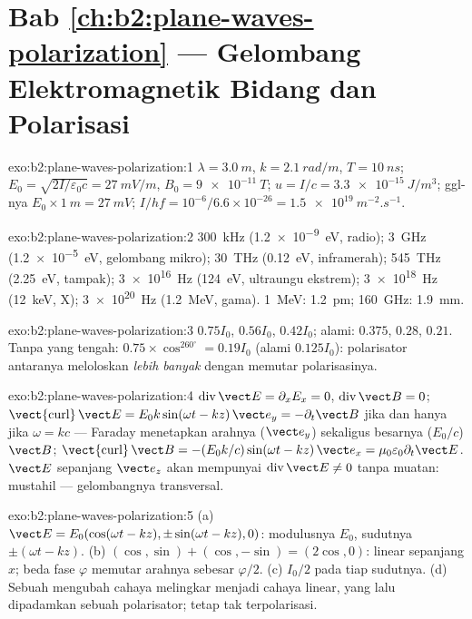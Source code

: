 \section*{Bab \ref{ch:b2:plane-waves-polarization} --- Gelombang Elektromagnetik Bidang dan Polarisasi}

\begin{solution}{exo:b2:plane-waves-polarization:1}
$\lambda = \qty{3.0}{m}$, $k = \qty{2.1}{rad/m}$, $T = \qty{10}{ns}$; $E_0 = \sqrt{2I/\varepsilon_0c}
= \qty{27}{mV/m}$, $B_0 = \qty{9e-11}{T}$; $u = I/c = \qty{3.3e-15}{J/m^3}$; ggl-nya
$E_0 \times \qty{1}{m} = \qty{27}{mV}$; $I/hf = 10^{-6}/6.6 \times 10^{-26} = \qty{1.5e19}{m^{-2}.s^{-1}}$.
\end{solution}

\begin{solution}{exo:b2:plane-waves-polarization:2}
\qty{300}{kHz} (\qty{1.2e-9}{eV}, radio); \qty{3}{GHz} (\qty{1.2e-5}{eV}, gelombang mikro);
\qty{30}{THz} (\qty{0.12}{eV}, inframerah); \qty{545}{THz} (\qty{2.25}{eV}, tampak);
\qty{3e16}{Hz} (\qty{124}{eV}, ultraungu ekstrem); \qty{3e18}{Hz} (\qty{12}{keV}, X);
\qty{3e20}{Hz} (\qty{1.2}{MeV}, gama). \qty{1}{MeV}: \qty{1.2}{pm}; \qty{160}{GHz}: \qty{1.9}{mm}.
\end{solution}

\begin{solution}{exo:b2:plane-waves-polarization:3}
$0.75I_0$, $0.56I_0$, $0.42I_0$; alami: $0.375$, $0.28$, $0.21$. Tanpa yang
tengah: $0.75 \times \cos^260^\circ = 0.19I_0$ (alami $0.125I_0$): polarisator
antaranya meloloskan \emph{lebih banyak} dengan memutar
polarisasinya.
\end{solution}

\begin{solution}{exo:b2:plane-waves-polarization:4}
$\operatorname{div}\vect E = \partial_xE_x = 0$, $\operatorname{div}\vect B = 0$;
$\operatorname{\vect{curl}}\vect E = E_0k\sin(\omega t - kz)\,\vect e_y = -\partial_t\vect B$ jika dan hanya jika $\omega =
kc$ --- Faraday menetapkan arahnya ($\vect e_y$) sekaligus besarnya
($E_0/c$) $\vect B$; $\operatorname{\vect{curl}}\vect B = -(E_0k/c)\sin(\omega t - kz)\,\vect e_x
= \mu_0\varepsilon_0\partial_t\vect E$. $\vect E$ sepanjang $\vect e_z$ akan mempunyai $\operatorname{div}
\vect E \ne 0$ tanpa muatan: mustahil --- gelombangnya transversal.
\end{solution}

\begin{solution}{exo:b2:plane-waves-polarization:5}
(a) $\vect E = E_0(\cos(\omega t - kz), \pm\sin(\omega t - kz), 0)$: modulusnya $E_0$,
sudutnya $\pm(\omega t - kz)$. (b) $(\cos, \sin) + (\cos, -\sin) = (2\cos, 0)$: linear
sepanjang $x$; beda fase $\varphi$ memutar arahnya sebesar $\varphi/2$. (c)
$I_0/2$ pada tiap sudutnya. (d) Sebuah  mengubah cahaya melingkar
menjadi cahaya linear, yang lalu dipadamkan sebuah polarisator; 
tetap tak terpolarisasi.
\end{solution}

